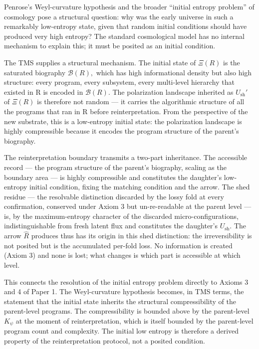 \documentclass[11pt,oneside]{report}
\theoremstyle{definition}
\theoremstyle{remark}
\begin{document}
Penrose's Weyl-curvature hypothesis and the broader ``initial entropy
problem'' of cosmology pose a structural question: why was the early
universe in such a remarkably low-entropy state, given that random
initial conditions should have produced very high entropy? The standard
cosmological model has no internal mechanism to explain this; it must be
posited as an initial condition.

The TMS supplies a structural mechanism. The initial state of \ensuremath{\Xi (R)} is
the saturated biography \ensuremath{\mathcal{B}(R),} which has high informational density but
also high structure: every program, every subsystem, every multi-level
hierarchy that existed in R is encoded in \ensuremath{\mathcal{B}(R).} The polarization
landscape inherited as \ensuremath{U_{\mathrm{sh}}'} of \ensuremath{\Xi (R)} is therefore not random --- it
carries the algorithmic structure of all the programs that ran in R
before reinterpretation. From the perspective of the new substrate, this
is a low-entropy initial state: the polarization landscape is highly
compressible because it encodes the program structure of the parent's
biography.

The reinterpretation boundary transmits a two-part inheritance. The
accessible record --- the program structure of the parent's biography,
scaling as the boundary area --- is highly compressible and constitutes
the daughter's low-entropy initial condition, fixing the matching
condition and the arrow. The shed residue --- the resolvable distinction
discarded by the lossy fold at every confirmation, conserved under
Axiom 3 but un-re-readable at the parent level --- is, by the
maximum-entropy character of the discarded micro-configurations,
indistinguishable from fresh latent flux and constitutes the daughter's
\ensuremath{U_{\mathrm{sh}}}. The arrow \ensuremath{\hat{R}} produces thus has its origin in this shed
distinction: the irreversibility is not posited but is the accumulated
per-fold loss. No information is created (Axiom 3) and none is lost; what
changes is which part is accessible at which level.

This connects the resolution of the initial entropy problem directly to
Axioms 3 and 4 of Paper 1. The Weyl-curvature hypothesis becomes, in TMS
terms, the statement that the initial state inherits the structural
compressibility of the parent-level programs. The compressibility is
bounded above by the parent-level \ensuremath{K_{\psi}} at the moment of
reinterpretation, which is itself bounded by the parent-level program
count and complexity. The initial low entropy is therefore a derived
property of the reinterpretation protocol, not a posited condition.
\end{document}
